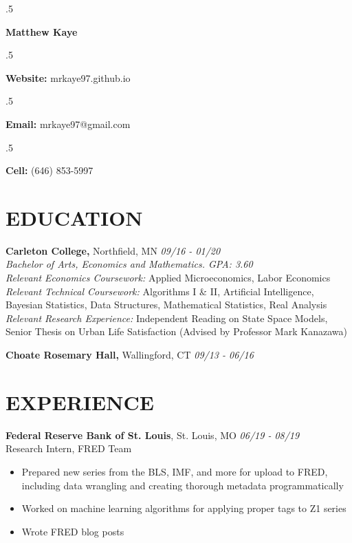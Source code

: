 \documentclass[margin, 10pt]{res} %
\begin{document}
\singlespacing

\moveleft.5\hoffset\centerline{\LARGE\bf Matthew Kaye} %
\medskip
\moveleft.5\hoffset\centerline{\textbf{Website:} mrkaye97.github.io}
\moveleft.5\hoffset\centerline{\textbf{Email:} mrkaye97@gmail.com}
\moveleft.5\hoffset\centerline{\textbf{Cell:} (646) 853-5997}


\begin{resume}


\section{EDUCATION}

{\sl} \textbf{Carleton College,} Northfield, MN \hfill \textit{09/16 - 01/20}\smallskip\\
{\sl Bachelor of Arts, Economics and Mathematics. GPA: 3.60} \smallskip\\
{\sl Relevant Economics Coursework: } Applied Microeconomics, Labor Economics \smallskip\\
{\sl Relevant Technical Coursework: } Algorithms I \& II, Artificial Intelligence, Bayesian Statistics, Data Structures, Mathematical Statistics, Real Analysis \smallskip\\
{\sl Relevant Research Experience: } Independent Reading on State Space Models, Senior Thesis on Urban Life Satisfaction (Advised by Professor Mark Kanazawa)

{\sl} \textbf{Choate Rosemary Hall,} Wallingford, CT \hfill \textit{09/13 -  06/16}

\section{EXPERIENCE}
{\sl} \textbf{Federal Reserve Bank of St. Louis}, St. Louis, MO \hfill \textit{06/19 - 08/19}\smallskip\\
{\sl} Research Intern, FRED Team \smallskip
{\sl} \begin{itemize}
	\item Prepared new series from the BLS, IMF, and more for upload to FRED, including data wrangling and creating thorough metadata programmatically
	\item Worked on machine learning algorithms for applying proper tags to Z1 series
	\item Wrote FRED blog posts
\end{itemize}


\end{resume}
\end{document}
